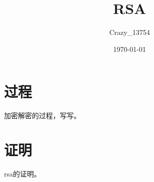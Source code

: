 \documentclass[a4paper]{article}
\title{\heiti\zihao{2} RSA}
\author{\songti Crazy\_13754}
\date{\today}
\begin{document}
    \maketitle
\section{过程}
加密解密的过程，写写。
\section[awa]{证明}
rsa的证明。
\end{document}
